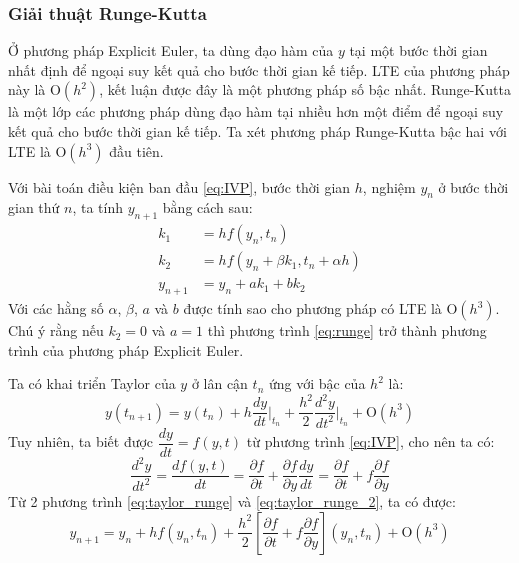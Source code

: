 \documentclass[a4paper]{article}
\begin{document}
\subsubsection{Giải thuật Runge-Kutta}\label{rungekuttamethod}
Ở phương pháp Explicit Euler, ta dùng đạo hàm của $y$ tại một bước thời gian nhất định để ngoại suy kết quả cho bước thời gian kế tiếp. LTE của phương pháp này là $\mbox{O}(h^2)$, kết luận được đây là một phương pháp số bậc nhất. Runge-Kutta là một lớp các phương pháp dùng đạo hàm tại nhiều hơn một điểm để ngoại suy kết quả cho bước thời gian kế tiếp. Ta xét phương pháp Runge-Kutta bậc hai với LTE là $\mbox{O}(h^3)$ đầu tiên.
\par
Với bài toán điều kiện ban đầu \eqref{eq:IVP}, bước thời gian $h$, nghiệm $y_n$ ở bước thời gian thứ $n$, ta tính $y_{n+1}$ bằng cách sau:
\begin{equation} \label{eq:runge}
\begin{aligned}
    k_1 &= hf(y_n,t_n) \\
    k_2 &= hf(y_n+\beta k_1, t_n + \alpha h) \\
    y_{n+1} &= y_n + ak_1 + bk_2
\end{aligned}
\end{equation}
Với các hằng số $\alpha$, $\beta$, $a$ và $b$ được tính sao cho phương pháp có LTE là $\mbox{O}(h^3)$. Chú ý rằng nếu $k_2 = 0$ và $a = 1$ thì phương trình \eqref{eq:runge} trở thành phương trình của phương pháp Explicit Euler.
\par
Ta có khai triển Taylor của $y$ ở lân cận $t_n$ ứng với bậc của $h^2$ là:
\begin{equation}\label{eq:taylor_runge}
    y(t_{n+1}) = y(t_n) + h \frac{dy}{dt}\vert _{t_n} + \frac {h^2}{2} \frac{d^2y}{dt^2}\vert _{t_n} + {\mbox{O}}(h^3) 
\end{equation}
Tuy nhiên, ta biết được $\dfrac{dy}{dt} = f(y,t)$ từ phương trình \eqref{eq:IVP}, cho nên ta có:
\begin{equation}\label{eq:taylor_runge_2}
\frac{d^2y}{dt^2} = \frac{df(y,t)}{dt} = \frac{\partial f}{\partial t} + \frac{\partial f}{\partial y} \frac{dy}{dt} = \frac{\partial f}{\partial t} + f\frac{\partial f}{\partial y}
\end{equation}
Từ 2 phương trình \eqref{eq:taylor_runge} và \eqref{eq:taylor_runge_2}, ta có được:
\begin{equation}\label{eq:sub_taylor}
y_{n+1} = y_n + h f(y_n,t_n) + \frac{h^2}{2} \left[\frac{\partial f}{\partial t} + f\frac{\partial f}{\partial y}\right](y_n,t_n)
+ {\mbox{O}}(h^3)
\end{equation}
\end{document}
